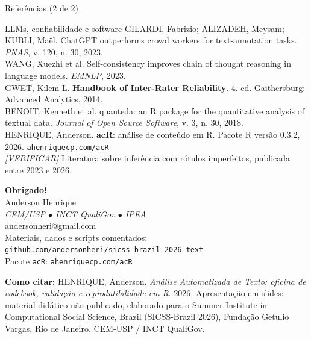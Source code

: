 \documentclass[11pt,aspectratio=169]{beamer}
\begin{document}
\begin{frame}{Referências (2 de 2)}
\scriptsize
\begin{block}{LLMs, confiabilidade e software}
GILARDI, Fabrizio; ALIZADEH, Meysam; KUBLI, Maël. ChatGPT outperforms crowd
workers for text-annotation tasks. \textit{PNAS}, v. 120, n. 30, 2023.\\[2pt]
WANG, Xuezhi et al. Self-consistency improves chain of thought reasoning in
language models. \textit{EMNLP}, 2023.\\[2pt]
GWET, Kilem L. \textbf{Handbook of Inter-Rater Reliability}. 4. ed.
Gaithersburg: Advanced Analytics, 2014.\\[2pt]
BENOIT, Kenneth et al. quanteda: an R package for the quantitative analysis of
textual data. \textit{Journal of Open Source Software}, v. 3, n. 30, 2018.\\[2pt]
HENRIQUE, Anderson. \textbf{acR}: análise de conteúdo em R. Pacote R versão
0.3.2, 2026. \texttt{ahenriquecp.com/acR}\\[2pt]
\textit{[VERIFICAR]} Literatura sobre inferência com rótulos imperfeitos,
publicada entre 2023 e 2026.
\end{block}
\end{frame}

\begin{frame}[plain]
\centering
\vspace{1.0cm}
{\Large \textbf{Obrigado!}}\\[0.45cm]
{\large Anderson Henrique}\\[0.18cm]
\textit{CEM/USP $\bullet$ INCT QualiGov $\bullet$ IPEA}\\[0.18cm]
andersonheri@gmail.com\\[0.7cm]

\small
Materiais, dados e scripts comentados:\\
\texttt{github.com/andersonheri/sicss-brazil-2026-text}\\[0.12cm]
Pacote \texttt{acR}: \texttt{ahenriquecp.com/acR}\\[0.7cm]

\parbox{0.85\textwidth}{\scriptsize
\textbf{Como citar:} HENRIQUE, Anderson. \textit{Análise Automatizada de Texto:
oficina de codebook, validação e reprodutibilidade em R}. 2026. Apresentação em
slides: material didático não publicado, elaborado para o Summer Institute in
Computational Social Science, Brazil (SICSS-Brazil 2026), Fundação Getulio
Vargas, Rio de Janeiro. CEM-USP / INCT QualiGov.}

\end{frame}
\end{document}
